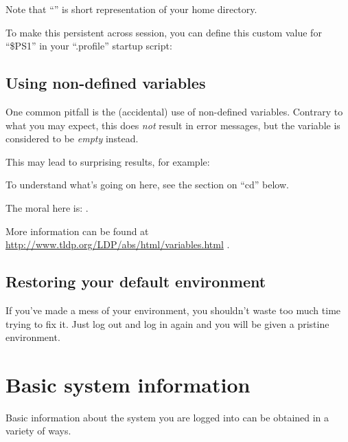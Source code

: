 Note that ``\tilde'' is short representation of your home directory.

To make this persistent across session, you can define this custom value for
``\$PS1'' in your ``.profile'' startup script:

\begin{prompt}
\end{prompt}

\subsection{Using non-defined variables}

One common pitfall is the (accidental) use of non-defined variables.  Contrary
to what you may expect, this does \emph{not} result in error messages, but the
variable is considered to be \emph{empty} instead.

This may lead to surprising results, for example:

\begin{prompt}
\end{prompt}

To understand what's going on here, see the section on ``cd'' below.

The moral here is: .


More information can be found at \url{http://www.tldp.org/LDP/abs/html/variables.html} .

\subsection{Restoring your default environment}

If you've made a mess of your environment, you shouldn't waste too much time
trying to fix it. Just log out and log in again and you will be given a
pristine environment.

\section{Basic system information}

Basic information about the system you are logged into can be obtained in a variety of ways.

